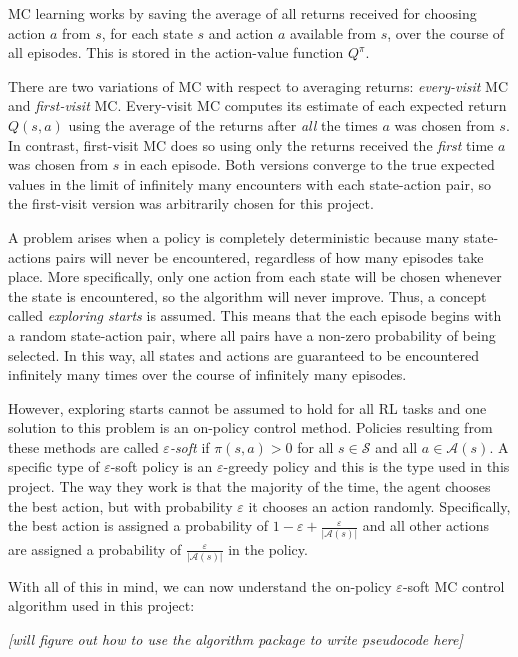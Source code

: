 \documentclass[11pt,a4paper]{report}
\begin{document}
MC learning works by saving the average of all returns received for choosing action $a$ from $s$, for each state $s$ and action $a$ available from $s$, over the course of all episodes. This is stored in the action-value function $Q^{\pi}$.

There are two variations of MC with respect to averaging returns: \emph{every-visit} MC and \emph{first-visit} MC. Every-visit MC computes its estimate of each expected return $Q(s,a)$ using the average of the returns after \emph{all} the times $a$ was chosen from $s$. In contrast, first-visit MC does so using only the returns received the \emph{first} time $a$ was chosen from $s$ in each episode. Both versions converge to the true expected values in the limit of infinitely many encounters with each state-action pair, so the first-visit version was arbitrarily chosen for this project.

A problem arises when a policy is completely deterministic because many state-actions pairs will never be encountered, regardless of how many episodes take place. More specifically, only one action from each state will be chosen whenever the state is encountered, so the algorithm will never improve. Thus, a concept called \emph{exploring starts} is assumed. This means that the each episode begins with a random state-action pair, where all pairs have a non-zero probability of being selected. In this way, all states and actions are guaranteed to be encountered infinitely many times over the course of infinitely many episodes.

However, exploring starts cannot be assumed to hold for all RL tasks and one solution to this problem is an on-policy control method. Policies resulting from these methods are called \emph{$\varepsilon$-soft} if $\pi(s,a) > 0$ for all $s \in \mathcal{S}$ and all $a \in \mathcal{A}(s)$. A specific type of $\varepsilon$-soft policy is an $\varepsilon$-greedy policy and this is the type used in this project. The way they work is that the majority of the time, the agent chooses the best action, but with probability $\varepsilon$ it chooses an action randomly. Specifically, the best action is assigned a probability of $1 - \varepsilon + \frac{\varepsilon}{|\mathcal{A}(s)|}$ and all other actions are assigned a probability of $\frac{\varepsilon}{|\mathcal{A}(s)|}$ in the policy.

With all of this in mind, we can now understand the on-policy $\varepsilon$-soft MC control algorithm used in this project:

\label{sec:monteCarloPseudocode}
\begin{center}
	\emph{[will figure out how to use the algorithm package to write pseudocode here]}
\end{center}
\end{document}
